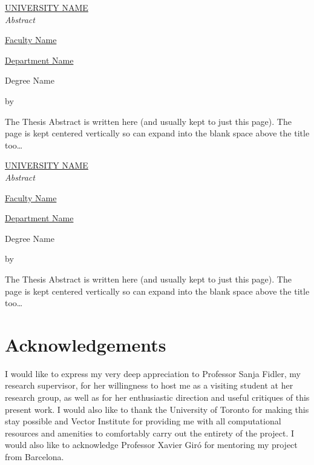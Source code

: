 \cleardoublepage
\thispagestyle{plain}
\null
\vfill
\begin{otherlanguage}{spanish}
  \centering
  \makeatletter
  \MakeUppercase{\href{https://href.com}{University Name}} \\
  \bigskip
  \huge{\textit{Abstract}} \\
  \bigskip
  {\normalsize \href{https://href.com}{Faculty Name} \par}
  {\normalsize \href{https://href.com}{Department Name} \par}
  \bigskip
  {\normalsize Degree Name \par}
  \bigskip
  {\normalsize\bfseries \@title \par}
  \medskip
  {\normalsize by \@author \par}
  \bigskip
  \makeatother
  \small{The Thesis Abstract is written here (and usually kept to just this
    page). The page is kept centered vertically so can expand into the blank space
    above the title too\ldots}
\end{otherlanguage}
\vfill
\null


\cleardoublepage
\thispagestyle{plain}
\null
\vfill
\begin{otherlanguage}{catalan}
  \centering
  \makeatletter
  \MakeUppercase{\href{https://href.com}{University Name}} \\
  \bigskip
  \huge{\textit{Abstract}} \\
  \bigskip
  {\normalsize \href{https://href.com}{Faculty Name} \par}
  {\normalsize \href{https://href.com}{Department Name} \par}
  \bigskip
  {\normalsize Degree Name \par}
  \bigskip
  {\normalsize\bfseries \@title \par}
  \medskip
  {\normalsize by \@author \par}
  \bigskip
  \makeatother
  \small{The Thesis Abstract is written here (and usually kept to just this
    page). The page is kept centered vertically so can expand into the blank space
    above the title too\ldots}
\end{otherlanguage}
\vfill
\null


\chapter*{Acknowledgements}

I would like to express my very deep appreciation to Professor Sanja Fidler, my
research supervisor, for her willingness to host me as a visiting student at her
research group, as well as for her enthusiastic direction and useful critiques
of this present work. I would also like to thank the University of Toronto for
making this stay possible and Vector Institute for providing me with all
computational resources and amenities to comfortably carry out the entirety of
the project. I would also like to acknowledge Professor Xavier Giró for
mentoring my project from Barcelona.

